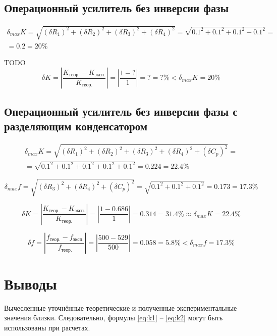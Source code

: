 \subsection{Операционный усилитель без инверсии фазы}

\begin{displaymath}
\begin{aligned}
	\delta_{max} K = \sqrt{(\delta R_1)^2 + (\delta R_2)^2 + (\delta R_3)^2 + (\delta R_4)^2} = \sqrt{0.1^2 + 0.1^2 + 0.1^2 + 0.1^2} = \\ = 0.2 = 20 \%
\end{aligned}
\end{displaymath}

TODO
\begin{displaymath}
	\delta K = \left|\frac{K_\text{теор.} - K_\text{эксп.}}{K_\text{теор.}} \right| = \left|\frac{1 - ?}{1}\right| = ? = ?\% < \delta_{max} K = 20\%
\end{displaymath}

\subsection{Операционный усилитель без инверсии фазы с разделяющим конденсатором}

\begin{displaymath}
\begin{aligned}
	\delta_{max} K = \sqrt{(\delta R_1)^2 + (\delta R_2)^2 + (\delta R_3)^2 + (\delta R_4)^2 + (\delta C_p)^2} = \\ = \sqrt{0.1^2 + 0.1^2 + 0.1^2 + 0.1^2 + 0.1^2} = 0.224 = 22.4 \%
\end{aligned}
\end{displaymath}

\begin{displaymath}
	\delta_{max} f = \sqrt{(\delta R_3)^2 + (\delta R_4)^2 + (\delta C_p)^2} =  \sqrt{0.1^2 + 0.1^2 + 0.1^2} = 0.173 = 17.3 \%
\end{displaymath}

\begin{displaymath}
	\delta K = \left|\frac{K_\text{теор.} - K_\text{эксп.}}{K_\text{теор.}} \right| = \left|\frac{1 - 0.686}{1}\right| = 0.314 = 31.4\% \approx \delta_{max} K = 22.4\%
\end{displaymath}

\begin{displaymath}
	\delta f = \left|\frac{f_\text{теор.} - f_\text{эксп.}}{f_\text{теор.}} \right| = \left|\frac{500 - 529}{500}\right| = 0.058 = 5.8\% < \delta_{max} f = 17.3\%
\end{displaymath}

\section{Выводы}

Вычесленные уточнённые теоретические и полученные экспериментальные значения близки. Следовательно, формулы \ref{eq:k1} -- \ref{eq:k2} могут быть использованы при расчетах.

